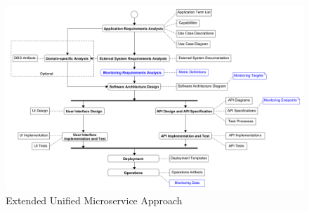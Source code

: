 \begin{figure}[h]
	\centering
	\includegraphics[width=\textwidth]{figures/ume_approach_extended.png}
	\caption{Extended Unified Microservice Approach}
	\label{fig:ume_approach_extended}
\end{figure}
